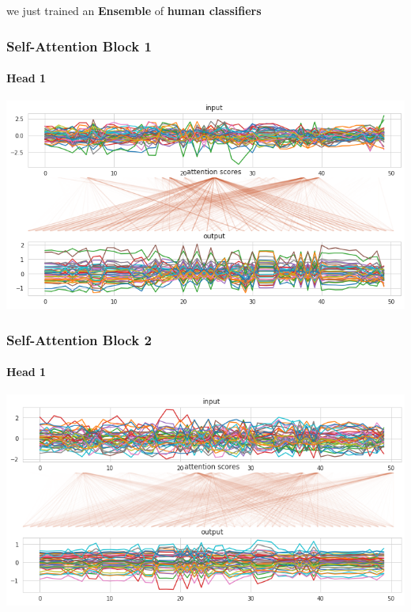 {
\begin{frame}[plain]

\vspace{8em}
\begin{center}
	\Huge\color{tumwhite}
	we just trained an \textbf{Ensemble} of \textbf{human classifiers} \\ 
\end{center}\color{white}

\end{frame}
}


\begin{frame}
\frametitle{Self-Attention Block 1}
\framesubtitle{Head 1}
\centering\includegraphics[width=.85\textwidth]{images/self-attention/transformer/self-attention-1}
\end{frame}


\begin{frame}
\frametitle{Self-Attention Block 2}
\framesubtitle{Head 1}
\centering\includegraphics[width=.85\textwidth]{images/self-attention/transformer/self-attention-2}
\end{frame}


